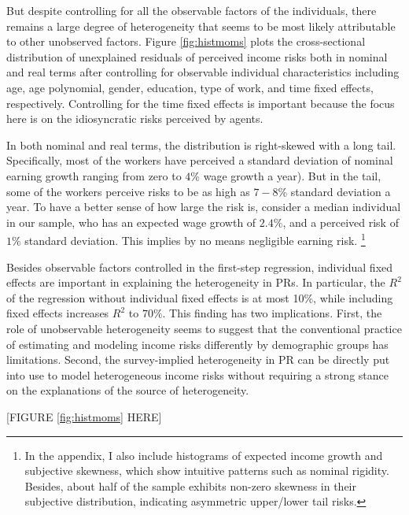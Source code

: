 But despite controlling for all the observable factors of the individuals, there remains a large degree of heterogeneity that seems to be most likely attributable to other unobserved factors. Figure \ref{fig:histmoms} plots the
cross-sectional distribution of unexplained residuals of perceived income risks both in nominal and real terms after controlling for observable individual characteristics including age, age polynomial, gender, education, type of work, and time fixed effects, respectively. Controlling for the time fixed effects is important because the focus here is on the idiosyncratic risks perceived by agents. 

In both nominal
and real terms, the distribution is right-skewed with a long tail.
Specifically, most of the workers have perceived a standard deviation of nominal
earning growth ranging from zero to \(4\%\) wage growth a year). But in the tail, some
of the workers perceive risks to be as high as \(7-8\%\) standard
deviation a year. To have a better sense of how large the risk is,
consider a median individual in our sample, who has an expected wage 
growth of \(2.4\%\), and a perceived risk of \(1\%\) standard deviation.
This implies by no means negligible earning risk.
\footnote{In the appendix, I also include histograms of expected income growth and subjective skewness, which show intuitive patterns such as nominal rigidity. Besides, about half of the sample exhibits non-zero skewness in their subjective distribution, indicating asymmetric upper/lower tail risks.}

Besides observable factors controlled in the first-step regression, individual fixed effects are important in explaining the heterogeneity in PRs. In particular, the $R^2$ of the regression without individual fixed effects is at most 10\%, while including fixed effects increases $R^2$ to $70\%$. This finding has two implications. First, the role of unobservable heterogeneity seems to suggest that the conventional practice of estimating and modeling income risks differently by demographic groups has limitations. Second, the survey-implied heterogeneity in PR can be directly put into use to model heterogeneous income risks without requiring a strong stance on the explanations of the source of heterogeneity.  

\begin{center}
[FIGURE \ref{fig:histmoms} HERE]
\end{center}

